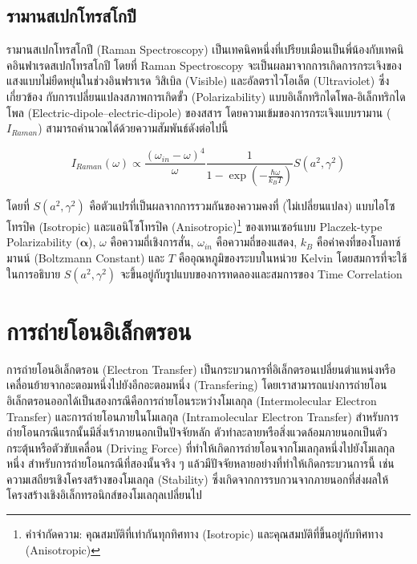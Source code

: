 \subsection{รามานสเปกโทรสโกปี}
\label{ssec:raman_spectro}

รามานสเปกโทรสโกปี (Raman Spectroscopy) เป็นเทคนิคหนึ่งที่เปรียบเมือนเป็นพี่น้องกับเทคนิคอินฟาเรดสเปกโทรสโกปี โดยที่ Raman Spectroscopy 
จะเป็นผลมาจากการเกิดการกระเจิงของแสงแบบไม่ยืดหยุ่นในช่วงอินฟราเรด วิสิเบิล (Visible) และอัลตราไวโอเล็ต (Ultraviolet) ซึ่งเกี่ยวข้อง%
กับการเปลี่ยนแปลงสภาพการเกิดขั้ว (Polarizability) แบบอิเล็กทริกไดโพล-อิเล็กทริกไดโพล (Electric-dipole--electric-dipole) 
ของสสาร โดยความเข้มของการกระเจิงแบบรามาน ($I_{Raman}$) สามารถคำนวณได้ด้วยความสัมพันธ์ดังต่อไปนี้\autocite{thomas2013}

\begin{equation}\label{eq:Raman_corr}
    I_{Raman} (\omega) \propto \frac{(\omega_{in}-\omega)^4}{\omega} 
    \frac{1}{1-\exp(-\frac{\hbar\omega}{k_{B}T})}S(a^{2}, \gamma^{2})
\end{equation}

\noindent โดยที่ $S(a^{2}, \gamma^{2})$ คือตัวแปรที่เป็นผลจากการรวมกันของความคงที่ (ไม่เปลี่ยนแปลง) แบบไอโซโทรปิค (Isotropic) 
และแอนิโซโทรปิค (Anisotropic)\footnote{คำจำกัดความ: คุณสมบัติที่เท่ากันทุกทิศทาง (Isotropic) และคุณสมบัติที่ขึ้นอยู่กับทิศทาง 
(Anisotropic)} ของเทนเซอร์แบบ Placzek-type Polarizability ($\bm{\alpha}$)\autocite{jensen2005}, $\omega$ 
คือความถี่เชิงการสั่น, $\omega_{in}$ คือความถี่ของแสดง, $k_{B}$ คือค่าคงที่ของโบลทซ์มานน์ (Boltzmann Constant) และ $T$ 
คืออุณหภูมิของระบบในหน่วย Kelvin โดยสมการที่จะใช้ในการอธิบาย $S(a^{2}, \gamma^{2})$ จะขึ้นอยู่กับรูปแบบของการทดลองและสมการของ 
Time Correlation\autocite{mattiat2021}

\section{การถ่ายโอนอิเล็กตรอน}
\label{sec:et}

การถ่ายโอนอิเล็กตรอน (Electron Transfer) เป็นกระบวนการที่อิเล็กตรอนเปลี่ยนตำแหน่งหรือเคลื่อนย้ายจากอะตอมหนึ่งไปยังอีกอะตอมหนึ่ง 
(Transfering) โดยเราสามารถแบ่งการถ่ายโอนอิเล็กตรอนออกได้เป็นสองกรณีคือการถ่ายโอนระหว่างโมเลกุล (Intermolecular Electron 
Transfer) และการถ่ายโอนภายในโมเลกุล (Intramolecular Electron Transfer) สำหรับการถ่ายโอนกรณีแรกนั้นมีสิ่งเร้าภายนอกเป็นปัจจัยหลัก 
ตัวทำละลายหรือสิ่งแวดล้อมภายนอกเป็นตัวกระตุ้นหรือตัวขับเคลื่อน (Driving Force) ที่ทำให้เกิดการถ่ายโอนจากโมเลกุลหนึ่งไปยังโมเลกุลหนึ่ง
สำหรับการถ่ายโอนกรณีที่สองนั้นจริง ๆ แล้วมีปัจจัยหลายอย่างที่ทำให้เกิดกระบวนการนี้ เช่น ความเสถียรเชิงโครงสร้างของโมเลกุล (Stability) 
ซึ่งเกิดจากการรบกวนจากภายนอกที่ส่งผลให้โครงสร้างเชิงอิเล็กทรอนิกส์ของโมเลกุลเปลี่ยนไป 

